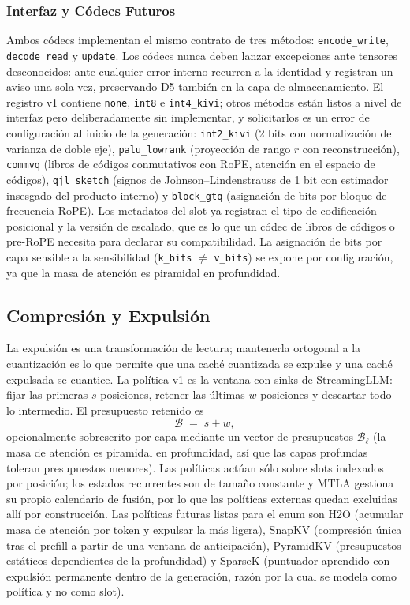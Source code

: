 \subsubsection{Interfaz y Códecs Futuros}

Ambos códecs implementan el mismo contrato de tres métodos: \texttt{encode\_write}, \texttt{decode\_read} y \texttt{update}. Los códecs nunca deben lanzar excepciones ante tensores desconocidos: ante cualquier error interno recurren a la identidad y registran un aviso una sola vez, preservando D5 también en la capa de almacenamiento. El registro v1 contiene \texttt{none}, \texttt{int8} e \texttt{int4\_kivi}; otros métodos están listos a nivel de interfaz pero deliberadamente sin implementar, y solicitarlos es un error de configuración al inicio de la generación: \texttt{int2\_kivi} (2 bits con normalización de varianza de doble eje), \texttt{palu\_lowrank} (proyección de rango $r$ con reconstrucción), \texttt{commvq} (libros de códigos conmutativos con RoPE, atención en el espacio de códigos), \texttt{qjl\_sketch} (signos de Johnson--Lindenstrauss de 1 bit con estimador insesgado del producto interno) y \texttt{block\_gtq} (asignación de bits por bloque de frecuencia RoPE). Los metadatos del slot ya registran el tipo de codificación posicional y la versión de escalado, que es lo que un códec de libros de códigos o pre-RoPE necesita para declarar su compatibilidad. La asignación de bits por capa sensible a la sensibilidad (\texttt{k\_bits} $\ne$ \texttt{v\_bits}) se expone por configuración, ya que la masa de atención es piramidal en profundidad.

\subsection{Compresión y Expulsión}
\label{sec:kv-evict}

La expulsión es una transformación de lectura; mantenerla ortogonal a la cuantización es lo que permite que una caché cuantizada se expulse y una caché expulsada se cuantice. La política v1 es la ventana con sinks de StreamingLLM: fijar las primeras $s$ posiciones, retener las últimas $w$ posiciones y descartar todo lo intermedio. El presupuesto retenido es
\[
\mathcal{B} \;=\; s + w ,
\]
opcionalmente sobrescrito por capa mediante un vector de presupuestos $\mathcal{B}_\ell$ (la masa de atención es piramidal en profundidad, así que las capas profundas toleran presupuestos menores). Las políticas actúan sólo sobre slots indexados por posición; los estados recurrentes son de tamaño constante y MTLA gestiona su propio calendario de fusión, por lo que las políticas externas quedan excluidas allí por construcción. Las políticas futuras listas para el enum son H2O (acumular masa de atención por token y expulsar la más ligera), SnapKV (compresión única tras el prefill a partir de una ventana de anticipación), PyramidKV (presupuestos estáticos dependientes de la profundidad) y SparseK (puntuador aprendido con expulsión permanente dentro de la generación, razón por la cual se modela como política y no como slot).

